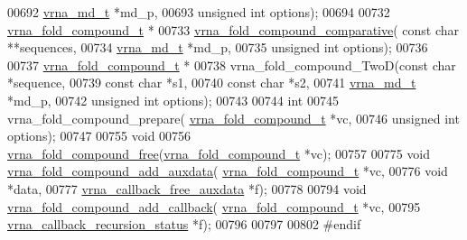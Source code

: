\begin{DoxyCode}
00692                     \hyperlink{group__model__details_structvrna__md__s}{vrna\_md\_t} *md\_p,
00693                     \textcolor{keywordtype}{unsigned} \textcolor{keywordtype}{int} options);
00694 
00732 \hyperlink{group__fold__compound_structvrna__fc__s}{vrna\_fold\_compound\_t} *
00733 \hyperlink{group__fold__compound_gad6bacc816af274922b13d947f708aa0c}{vrna\_fold\_compound\_comparative}( \textcolor{keyword}{const} \textcolor{keywordtype}{char} **sequences,
00734                                 \hyperlink{group__model__details_structvrna__md__s}{vrna\_md\_t} *md\_p,
00735                                 \textcolor{keywordtype}{unsigned} \textcolor{keywordtype}{int} options);
00736 
00737 \hyperlink{group__fold__compound_structvrna__fc__s}{vrna\_fold\_compound\_t} *
00738 vrna\_fold\_compound\_TwoD(\textcolor{keyword}{const} \textcolor{keywordtype}{char} *sequence,
00739                         \textcolor{keyword}{const} \textcolor{keywordtype}{char} *s1,
00740                         \textcolor{keyword}{const} \textcolor{keywordtype}{char} *s2,
00741                         \hyperlink{group__model__details_structvrna__md__s}{vrna\_md\_t} *md\_p,
00742                         \textcolor{keywordtype}{unsigned} \textcolor{keywordtype}{int} options);
00743 
00744 \textcolor{keywordtype}{int}
00745 vrna\_fold\_compound\_prepare( \hyperlink{group__fold__compound_structvrna__fc__s}{vrna\_fold\_compound\_t} *vc,
00746                             \textcolor{keywordtype}{unsigned} \textcolor{keywordtype}{int} options);
00747 
00755 \textcolor{keywordtype}{void}
00756 \hyperlink{group__fold__compound_gadded6039d63f5d6509836e20321534ad}{vrna\_fold\_compound\_free}(\hyperlink{group__fold__compound_structvrna__fc__s}{vrna\_fold\_compound\_t} *vc);
00757 
00775 \textcolor{keywordtype}{void} \hyperlink{group__fold__compound_ga6316a9426bea2f742375e8df6febd3f6}{vrna\_fold\_compound\_add\_auxdata}(
      \hyperlink{group__fold__compound_structvrna__fc__s}{vrna\_fold\_compound\_t} *vc,
00776                                     \textcolor{keywordtype}{void} *data,
00777                                     \hyperlink{group__fold__compound_ga3ae51bfd5fc3236652d1de4e3274b49b}{vrna\_callback\_free\_auxdata} *f);
00778 
00794 \textcolor{keywordtype}{void} \hyperlink{group__fold__compound_ga097ed6133055624667cbce8cfdebf82d}{vrna\_fold\_compound\_add\_callback}( 
      \hyperlink{group__fold__compound_structvrna__fc__s}{vrna\_fold\_compound\_t} *vc,
00795                                       \hyperlink{group__fold__compound_ga4a4a0d838de6d18315bafc84f93f5cc0}{vrna\_callback\_recursion\_status} *f);
00796 
00797 
00802 \textcolor{preprocessor}{#endif}
\end{DoxyCode}
